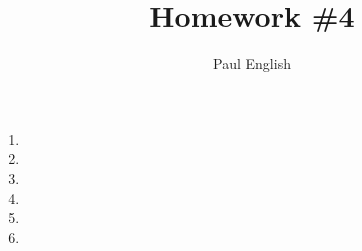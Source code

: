 \documentclass[11pt, oneside]{article}
\title{Homework \#4}
\author{
Paul English \\
}
\begin{document}
\maketitle

\begin{enumerate}

\item 
\item 
\item 
\item 
\item 
\item 

\end{enumerate}
\end{document}
